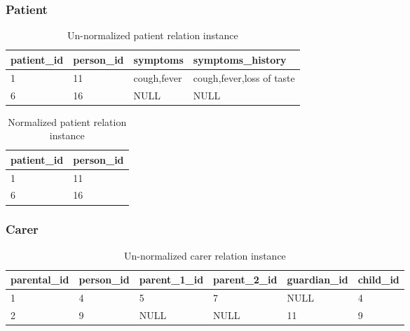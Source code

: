 \documentclass{article}
\begin{document}
\subsubsection{Patient}
\begin{table}[H]
\centering
\begin{adjustbox}{width=0.5\textwidth,center=\textwidth}
\begin{tabular}{|l|l|l|l|} 
        \hline
        patient\_id & person\_id & symptoms & symptoms\_history \\ 
        \hline
        1 & 11 & cough,fever & cough,fever,loss of taste\\
        6 & 16 & NULL & NULL\\
        \hline
\end{tabular}
\end{adjustbox}
\caption{Un-normalized patient relation instance}
\end{table}

\begin{table}[H]
\centering
\begin{adjustbox}{width=0.2\textwidth,center=\textwidth}
\begin{tabular}{|l|l|} 
        \hline
        patient\_id & person\_id \\ 
        \hline
        1 & 11 \\
        6 & 16 \\
        \hline
\end{tabular}
\end{adjustbox}
\caption{Normalized patient relation instance}
\end{table}



\subsubsection{Carer}
\begin{table}[H]
\centering
\begin{adjustbox}{width=0.6\textwidth,center=\textwidth}
\begin{tabular}{|l|l|l|l|l|l|} 
        \hline
        parental\_id & person\_id & parent\_1\_id & parent\_2\_id & guardian\_id & child\_id\\ 
        \hline
        1 & 4 & 5 & 7 & NULL & 4\\
        2 & 9 & NULL & NULL & 11 & 9\\
        \hline
\end{tabular}
\end{adjustbox}
\caption{Un-normalized carer relation instance}
\end{table}
\end{document}
